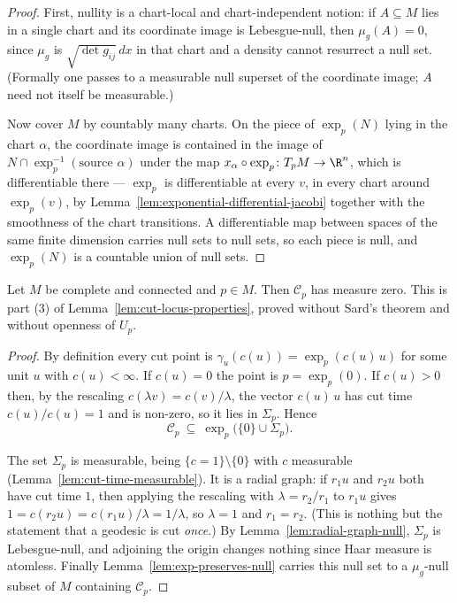 \begin{proof}
\leanok
First, nullity is a chart-local and chart-independent notion: if
$A\subseteq M$ lies in a single chart and its coordinate image is
Lebesgue-null, then $\mu_g(A)=0$, since $\mu_g$ is
$\sqrt{\det g_{ij}}\,dx$ in that chart and a density cannot resurrect a
null set. (Formally one passes to a measurable null superset of the
coordinate image; $A$ need not itself be measurable.)

Now cover $M$ by countably many charts. On the piece of $\exp_p(N)$
lying in the chart $\alpha$, the coordinate image is contained in the
image of $N\cap\exp_p^{-1}(\text{source }\alpha)$ under the map
$x_\alpha\circ\exp_p\colon T_pM\to\R^n$, which is differentiable there
--- $\exp_p$ is differentiable at every $v$, in every chart around
$\exp_p(v)$, by Lemma~\ref{lem:exponential-differential-jacobi}
together with the smoothness of the chart transitions. A differentiable
map between spaces of the same finite dimension carries null sets to
null sets, so each piece is null, and $\exp_p(N)$ is a countable union
of null sets.
\end{proof}

\begin{lemma}
\label{lem:cut-locus-null}
\leanok
Let $M$ be complete and connected and $p\in M$. Then ${\mathcal C}_p$
has measure zero. This is part (3) of
Lemma~\ref{lem:cut-locus-properties}, proved without Sard's theorem and
without openness of $U_p$.
\end{lemma}

\begin{proof}
\leanok
By definition every cut point is $\gamma_u(c(u))=\exp_p(c(u)\,u)$ for
some unit $u$ with $c(u)<\infty$. If $c(u)=0$ the point is
$p=\exp_p(0)$. If $c(u)>0$ then, by the rescaling
$c(\lambda v)=c(v)/\lambda$, the vector $c(u)\,u$ has cut time
$c(u)/c(u)=1$ and is non-zero, so it lies in $\Sigma_p$. Hence
$${\mathcal C}_p\ \subseteq\ \exp_p\bigl(\{0\}\cup\Sigma_p\bigr).$$

The set $\Sigma_p$ is measurable, being $\{c=1\}\setminus\{0\}$ with
$c$ measurable (Lemma~\ref{lem:cut-time-measurable}). It is a radial
graph: if $r_1u$ and $r_2u$ both have cut time $1$, then applying the
rescaling with $\lambda=r_2/r_1$ to $r_1u$ gives
$1=c(r_2u)=c(r_1u)/\lambda=1/\lambda$, so $\lambda=1$ and $r_1=r_2$.
(This is nothing but the statement that a geodesic is cut \emph{once}.)
By Lemma~\ref{lem:radial-graph-null}, $\Sigma_p$ is Lebesgue-null, and
adjoining the origin changes nothing since Haar measure is atomless.
Finally Lemma~\ref{lem:exp-preserves-null} carries this null set to a
$\mu_g$-null subset of $M$ containing ${\mathcal C}_p$.
\end{proof}

